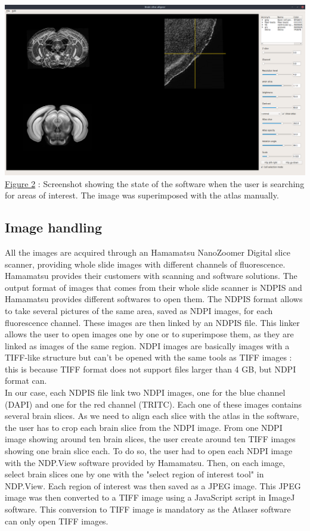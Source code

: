 \documentclass[a4paper,12pt]{report}
\begin{document}
\begin{center} \includegraphics[scale=0.25]{oldWhenCellSelectionning.png}\\
\underline{Figure 2} : Screenshot showing the state of the software when the user is searching for areas of interest. The image was superimposed with the atlas manually. \\ \vspace{1\baselineskip} \end{center}

\subsection{Image handling}

All the images are acquired through an Hamamatsu NanoZoomer Digital slice scanner, providing whole slide images with different channels of fluorescence. Hamamatsu provides their customers with scanning and software solutions. The output format of images that comes from their whole slide scanner is NDPIS and Hamamatsu provides different softwares to open them. The NDPIS format allows to take several pictures of the same area, saved as NDPI images, for each fluorescence channel. These images are then linked by an NDPIS file. This linker allows the user to open images one by one or to superimpose them, as they are linked as images of the same region. NDPI images are basically images with a TIFF-like structure but can't be opened with the same tools as TIFF images : this is because TIFF format does not support files larger than 4 GB, but NDPI format can. \\

In our case, each NDPIS file link two NDPI images, one for the blue channel (DAPI) and one for the red channel (TRITC). Each one of these images contains several brain slices. As we need to align each slice with the atlas in the software, the user has to crop each brain slice from the NDPI image. From one NDPI image showing around ten brain slices, the user create around ten TIFF images showing one brain slice each. To do so, the user had to open each NDPI image with the NDP.View software provided by Hamamatsu. Then, on each image, select brain slices one by one with the "select region of interest tool" in NDP.View. Each region of interest was then saved as a JPEG image. This JPEG image was then converted to a TIFF image using a JavaScript script in ImageJ software. This conversion to TIFF image is mandatory as the Atlaser software can only open TIFF images. \\
\end{document}
